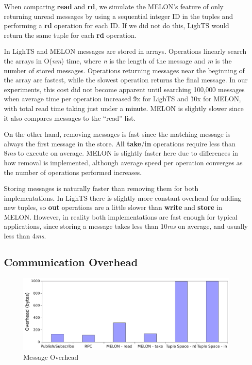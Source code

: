 \documentclass[lnicst]{svmultln}
\begin{document}
When comparing \textbf{read} and \textbf{rd}, we simulate the MELON's feature of only returning unread messages by using a sequential integer ID in the tuples and performing a \textbf{rd} operation for each ID. If we did not do this, LighTS would return the same tuple for each \textbf{rd} operation.

In LighTS and MELON messages are stored in arrays. Operations linearly search the arrays in O(\textit{nm}) time, where \textit{n} is the length of the message and \textit{m} is the number of stored messages. Operations returning messages near the beginning of the array are fastest, while the slowest operation returns the final message. In our experiments, this cost did not become apparent until searching 100,000 messages when average time per operation increased \~9x for LighTS and \~10x for MELON, with total read time taking just under a minute. MELON is slightly slower since it also compares messages to the ``read'' list.

On the other hand, removing messages is fast since the matching message is always the first message in the store. All \textbf{take}/\textbf{in} operations require less than 8\textit{ms} to execute on average. MELON is slightly faster here due to differences in how removal is implemented, although average speed per operation converges as the number of operations performed increases.

Storing messages is naturally faster than removing them for both implementations. In LighTS there is slightly more constant overhead for adding new tuples, so \textbf{out} operations are a little slower than \textbf{write} and \textbf{store} in MELON.  However, in reality both implementations are fast enough for typical applications, since storing a message takes less than 10\textit{ms} on average, and usually less than 4\textit{ms}.

\subsection{Communication Overhead}\label{sec:overhead}

\begin{figure}
\centering
\includegraphics[scale = .50, clip, trim = 0px 0px 0px 0px]{figures/overhead.pdf}
\caption{Message Overhead}
\label{fig:overhead}
\end{figure}
\end{document}
